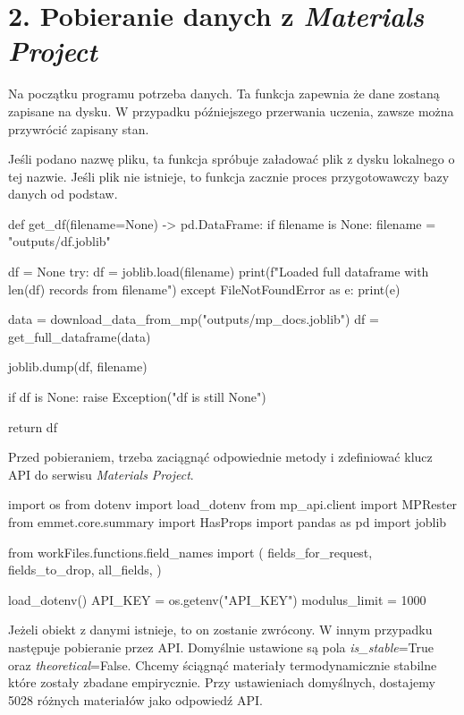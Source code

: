 {}
\justify
\fontsize{14}{16}\selectfont
\setlength{\parindent}{0pt}
\section*{2. Pobieranie danych z \textit{Materials Project}} 
\fontsize{12}{14}\selectfont

\hspace{1.5cm} Na początku programu potrzeba danych. 
Ta funkcja zapewnia że dane zostaną zapisane na dysku. 
W przypadku późniejszego przerwania uczenia, zawsze można przywrócić zapisany stan.

Jeśli podano nazwę pliku, ta funkcja spróbuje załadować plik z dysku lokalnego o tej nazwie. 
Jeśli plik nie istnieje, to funkcja zacznie proces przygotowawczy bazy danych od podstaw.

\begin{pythoncode}
def get_df(filename=None) -> pd.DataFrame:
    if filename is None:
        filename = "outputs/df.joblib"

    df = None
    try:
        df = joblib.load(filename)
        print(f"Loaded full dataframe with {len(df)} records from {filename}")
    except FileNotFoundError as e:
        print(e)

        data = download_data_from_mp("outputs/mp_docs.joblib")
        df = get_full_dataframe(data)

        joblib.dump(df, filename)

    if df is None:
        raise Exception("df is still None")

    return df
\end{pythoncode}


Przed pobieraniem, trzeba zaciągnąć odpowiednie metody i zdefiniować klucz API do serwisu \textit{Materials Project}. 

\begin{pythoncode}
import os
from dotenv import load_dotenv
from mp_api.client import MPRester
from emmet.core.summary import HasProps
import pandas as pd
import joblib

from workFiles.functions.field_names import (
    fields_for_request,
    fields_to_drop,
    all_fields,
)

load_dotenv()
API_KEY = os.getenv("API_KEY")
modulus_limit = 1000
\end{pythoncode}

\hspace{1.5cm} Jeżeli obiekt z danymi istnieje, to on zostanie zwrócony. W innym przypadku następuje pobieranie przez API. 
Domyślnie ustawione są pola \textit{is\_stable}=True oraz \textit{theoretical}=False. Chcemy ściągnąć materiały termodynamicznie stabilne które zostały zbadane empirycznie. Przy ustawieniach domyślnych, dostajemy 5028 różnych materiałów jako odpowiedź API.

